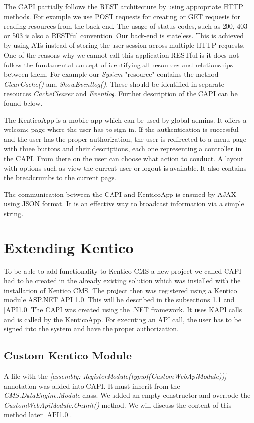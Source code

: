 The CAPI partially follows the REST architecture by using appropriate HTTP methods. For example we use POST requests for creating or GET requests for reading resources from the back-end. The usage of status codes, such as 200, 403 or 503 is also a RESTful convention. Our back-end is stateless. This is achieved by using ATs instead of storing the user session across multiple HTTP requests. One of the reasons why we cannot call this application RESTful is it does not follow the fundamental concept of identifying all resources and relationships between them. For example our \textit{System} "resource" contains the method \textit{ClearCache()} and \textit{ShowEventlog()}. These should be identified in separate resources \textit{CacheClearer} and \textit{Eventlog}. Further description of the CAPI can be found below.

The KenticoApp is a mobile app which can be used by global admins. It offers a welcome page where the user has to sign in. If the authentication is successful and the user has the proper authorization, the user is redirected to a menu page with three buttons and their descriptions, each one representing a controller in the CAPI. From there on the user can choose what action to conduct. A layout with options such as view the current user or logout is available. It also contains the breadcrumbs to the current page. 

The communication between the CAPI and KenticoApp is ensured by AJAX using JSON format. It is an effective way to broadcast information via a simple string.

\section{Extending Kentico} \label{implExtendingKentico}
To be able to add functionality to Kentico CMS a new project we called CAPI had to be created in the already existing solution which was installed with the installation of Kentico CMS. The  project then was registered using a Kentico module ASP.NET API 1.0. This will be described in the subsections \ref{cutomModule} and \ref{API1.0}
The CAPI was created using the .NET framework. It uses KAPI calls and is called by the KenticoApp. For executing an API call, the user has to be signed into the system and have the proper authorization. 
\subsection{Custom Kentico Module} \label{cutomModule}
A file with the \textit{[assembly: RegisterModule(typeof(CustomWebApiModule))]} annotation was added into CAPI. It must inherit from the \textit{CMS.DataEngine.Module} class. We added an empty constructor and overrode the \textit{CustomWebApiModule.OnInit()} method. We will discuss the content of this method later \ref{API1.0}. 
